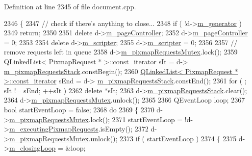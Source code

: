 Definition at line 2345 of file document.\+cpp.


\begin{DoxyCode}
2346 \{
2347     \textcolor{comment}{// check if there's anything to close...}
2348     \textcolor{keywordflow}{if} ( !d->\hyperlink{classOkular_1_1DocumentPrivate_a52083f79ce95756ddea060e74315e91f}{m\_generator} )
2349         \textcolor{keywordflow}{return};
2350 
2351     \textcolor{keyword}{delete} d->\hyperlink{classOkular_1_1DocumentPrivate_a0764e01a78ed52ece9229f50300522f1}{m\_pageController};
2352     d->\hyperlink{classOkular_1_1DocumentPrivate_a0764e01a78ed52ece9229f50300522f1}{m\_pageController} = 0;
2353 
2354     \textcolor{keyword}{delete} d->\hyperlink{classOkular_1_1DocumentPrivate_aa92ce51e07aaab18bd40542eb9bc31e6}{m\_scripter};
2355     d->\hyperlink{classOkular_1_1DocumentPrivate_aa92ce51e07aaab18bd40542eb9bc31e6}{m\_scripter} = 0;
2356 
2357      \textcolor{comment}{// remove requests left in queue}
2358     d->\hyperlink{classOkular_1_1DocumentPrivate_a5c0e919d575a7a3c19a42c64a672fce4}{m\_pixmapRequestsMutex}.lock();
2359     \hyperlink{classQLinkedList}{QLinkedList< PixmapRequest * >::const\_iterator} sIt = d->
      \hyperlink{classOkular_1_1DocumentPrivate_af903e531960617af53b4bc79b3a95efa}{m\_pixmapRequestsStack}.constBegin();
2360     \hyperlink{classQLinkedList}{QLinkedList< PixmapRequest * >::const\_iterator} sEnd = d->
      \hyperlink{classOkular_1_1DocumentPrivate_af903e531960617af53b4bc79b3a95efa}{m\_pixmapRequestsStack}.constEnd();
2361     \textcolor{keywordflow}{for} ( ; sIt != sEnd; ++sIt )
2362         \textcolor{keyword}{delete} *sIt;
2363     d->\hyperlink{classOkular_1_1DocumentPrivate_af903e531960617af53b4bc79b3a95efa}{m\_pixmapRequestsStack}.clear();
2364     d->\hyperlink{classOkular_1_1DocumentPrivate_a5c0e919d575a7a3c19a42c64a672fce4}{m\_pixmapRequestsMutex}.unlock();
2365 
2366     QEventLoop loop;
2367     \textcolor{keywordtype}{bool} startEventLoop = \textcolor{keyword}{false};
2368     \textcolor{keywordflow}{do}
2369     \{
2370         d->\hyperlink{classOkular_1_1DocumentPrivate_a5c0e919d575a7a3c19a42c64a672fce4}{m\_pixmapRequestsMutex}.lock();
2371         startEventLoop = !d->\hyperlink{classOkular_1_1DocumentPrivate_adc84c2f8f76e7880b41e155edabf69e7}{m\_executingPixmapRequests}.isEmpty();
2372         d->\hyperlink{classOkular_1_1DocumentPrivate_a5c0e919d575a7a3c19a42c64a672fce4}{m\_pixmapRequestsMutex}.unlock();
2373         \textcolor{keywordflow}{if} ( startEventLoop )
2374         \{
2375             d->\hyperlink{classOkular_1_1DocumentPrivate_a836cb1b614d8d25bad8403dfd746ef00}{m\_closingLoop} = &loop;

\end{DoxyCode}
